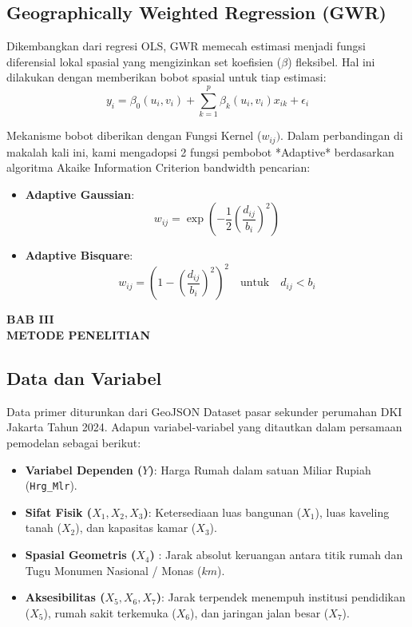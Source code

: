 \documentclass[12pt,a4paper]{article}
\begin{document}
\subsection{Geographically Weighted Regression (GWR)}
Dikembangkan dari regresi OLS, GWR memecah estimasi menjadi fungsi diferensial lokal spasial yang mengizinkan set koefisien ($\beta$) fleksibel. Hal ini dilakukan dengan memberikan bobot spasial untuk tiap estimasi:
\[ y_i = \beta_0(u_i, v_i) + \sum_{k=1}^{p} \beta_k(u_i, v_i) x_{ik} + \epsilon_i \]

Mekanisme bobot diberikan dengan Fungsi Kernel ($w_{ij})$. Dalam perbandingan di makalah kali ini, kami mengadopsi 2 fungsi pembobot *Adaptive* berdasarkan algoritma Akaike Information Criterion bandwidth pencarian:
\begin{itemize}
    \item \textbf{Adaptive Gaussian}: \[ w_{ij} = \exp \left( - \frac{1}{2}\left(\frac{d_{ij}}{b_i}\right)^2 \right) \]
    \item \textbf{Adaptive Bisquare}: \[ w_{ij} = \left( 1 - \left( \frac{d_{ij}}{b_i} \right)^2 \right)^2 \quad \text{untuk} \quad d_{ij} < b_i \]
\end{itemize}

\newpage
\begin{center}
    \bfseries\large
    BAB III \\
    METODE PENELITIAN
\end{center}
\setcounter{section}{3}
\setcounter{subsection}{0}

\subsection{Data dan Variabel}
Data primer diturunkan dari GeoJSON Dataset pasar sekunder perumahan DKI Jakarta Tahun 2024. Adapun variabel-variabel yang ditautkan dalam persamaan pemodelan sebagai berikut:
\begin{itemize}
    \item \textbf{Variabel Dependen ($Y$)}: Harga Rumah dalam satuan Miliar Rupiah (\texttt{Hrg\_Mlr}).
    \item \textbf{Sifat Fisik ($X_1, X_2, X_3$)}: Ketersediaan luas bangunan ($X_1$), luas kaveling tanah ($X_2$), dan kapasitas kamar ($X_3$).
    \item \textbf{Spasial Geometris ($X_4$) }: Jarak absolut keruangan antara titik rumah dan Tugu Monumen Nasional / Monas ($km$).
    \item \textbf{Aksesibilitas ($X_5, X_6, X_7$)}: Jarak terpendek menempuh institusi pendidikan ($X_5$), rumah sakit terkemuka ($X_6$), dan jaringan jalan besar ($X_7$).
\end{itemize}
\end{document}
